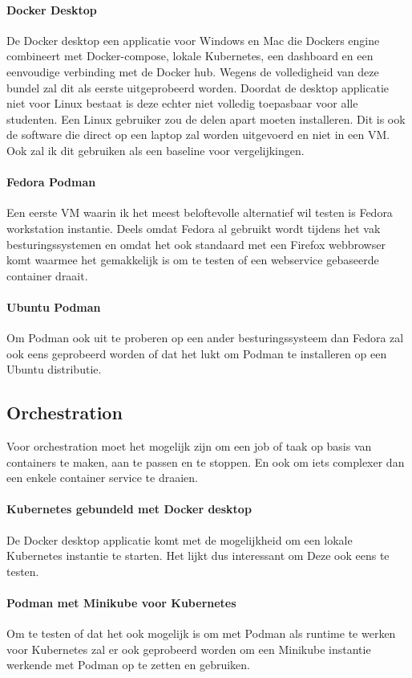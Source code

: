 \paragraph{Docker Desktop}
De Docker desktop een applicatie voor Windows en Mac die Dockers engine combineert met Docker-compose, lokale Kubernetes, een dashboard en een eenvoudige verbinding met de Docker hub. Wegens de volledigheid van deze bundel zal dit als eerste uitgeprobeerd worden. Doordat de desktop applicatie niet voor Linux bestaat is deze echter niet volledig toepasbaar voor alle studenten. Een Linux gebruiker zou de delen apart moeten installeren. Dit is ook de software die direct op een laptop zal worden uitgevoerd en niet in een VM. Ook zal ik dit gebruiken als een baseline voor vergelijkingen. 

\paragraph{Fedora Podman}
Een eerste VM waarin ik het meest beloftevolle alternatief wil testen is Fedora workstation instantie. Deels omdat Fedora al gebruikt wordt tijdens het vak besturingssystemen en omdat het ook standaard met een Firefox webbrowser komt waarmee het gemakkelijk is om te testen of een webservice gebaseerde container draait.

\paragraph{Ubuntu Podman}
Om Podman ook uit te proberen op een ander besturingssysteem dan Fedora zal ook eens geprobeerd worden of dat het lukt om Podman te installeren op een Ubuntu distributie.

\subsection{Orchestration}
Voor orchestration moet het mogelijk zijn om een job of taak op basis van containers te maken, aan te passen en te stoppen. En ook om iets complexer dan een enkele container service te draaien.

\paragraph{Kubernetes gebundeld met Docker desktop}
De Docker desktop applicatie komt met de mogelijkheid om een lokale Kubernetes instantie te starten. Het lijkt dus interessant om Deze ook eens te testen.

\paragraph{Podman met Minikube voor Kubernetes}
Om te testen of dat het ook mogelijk is om met Podman als runtime te werken voor Kubernetes zal er ook geprobeerd worden om een Minikube instantie werkende met Podman op te zetten en gebruiken.

